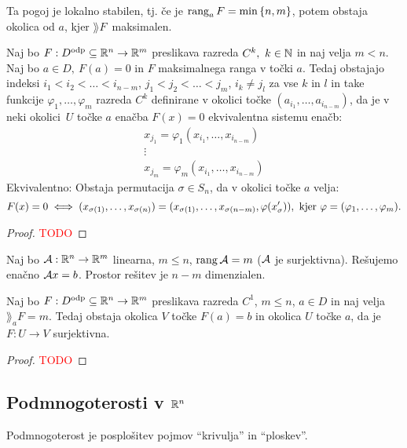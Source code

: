 \begin{opomba}
    Ta pogoj je lokalno stabilen, tj. če je $\operatorname{rang}_aF = \min \left\{n, m\right\}$, potem obstaja okolica od $a$, kjer $\rang F$~maksimalen.
\end{opomba}

\newpage
\begin{posledica}
    Naj bo $F: D^\text{odp} \subseteq \mathbb{R}^n \to \mathbb{R}^m$ preslikava razreda $C^k, \ k \in \mathbb{N}$ in naj velja $m < n$. Naj bo $a \in D, \ F(a) = 0$ in $F$ maksimalnega ranga v točki $a$. Tedaj obstajajo indeksi $i_1 < i_2 < \ldots < i_{n-m}$, $j_1 < j_2 < \ldots <j_m$, $i_k \neq j_l$ za vse $k$ in $l$ in take funkcije $\varphi_1, \ldots, \varphi_m$ razreda $C^k$ definirane v okolici točke $(a_{i_1}, \ldots, a_{i_{n-m}})$, da je v neki okolici~$U$ točke $a$ enačba $F(x) = 0$ ekvivalentna sistemu enačb: 
    \begin{align*}
        x_{j_1} = \varphi_1(x_{i_1}, \ldots, x_{i_{n-m}}) \\
        \vdots \\
        x_{j_m} = \varphi_m(x_{i_1}, \ldots, x_{i_{n-m}})
    \end{align*}
    Ekvivalentno: Obstaja permutacija $\sigma \in S_n$, da v okolici točke $a$ velja:
    $$F(x) = 0 \iff (x_{\sigma(1)}, \ldots, x_{\sigma(n)}) = (x_{\sigma(1)}, \ldots, x_{\sigma(n-m)}, \varphi(x_\sigma')), \text{ kjer } \varphi = (\varphi_1, \ldots, \varphi_m).$$
\end{posledica}

\begin{proof}
    \textcolor{red}{TODO}
\end{proof}

\begin{primer}
    Naj bo $\mathcal{A}: \mathbb{R}^n \to \mathbb{R}^m$ linearna, $m \leq n$, $\operatorname{rang} \mathcal{A} = m$ ($\mathcal{A}$ je surjektivna). Rešujemo enačno $\mathcal{A}x=b$. Prostor rešitev je $n-m$ dimenzialen.
\end{primer}

\begin{posledica}
    Naj bo $F: D^\text{odp} \subseteq \mathbb{R}^n \to \mathbb{R}^m$ preslikava razreda $C^1$, $m \leq n$, $a \in D$ in naj velja $\rang_aF=m$. Tedaj obstaja okolica $V$ točke $F(a) = b$ in okolica $U$ točke $a$, da je $F: U \to V$ surjektivna.
\end{posledica}

\begin{proof}
    \textcolor{red}{TODO}
\end{proof}

\subsection{Podmnogoterosti v $\mathbb{R}^n$}
Podmnogoterost je posplošitev pojmov "`krivulja"' in "`ploskev"'.

